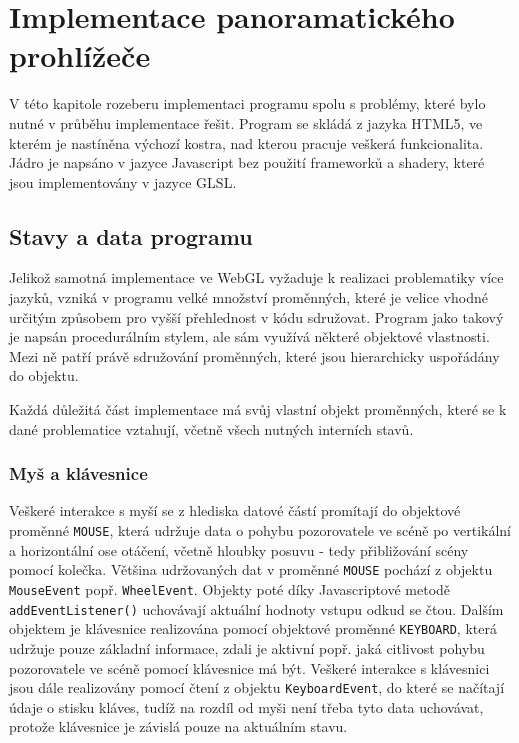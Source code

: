 \chapter{Implementace panoramatického prohlížeče}
\label{chapter:4}
V této kapitole rozeberu implementaci programu  spolu s  problémy, které bylo nutné v průběhu implementace řešit. Program se skládá z jazyka HTML5, ve kterém je nastíněna výchozí kostra, nad kterou pracuje veškerá funkcionalita. Jádro je napsáno v jazyce Javascript bez použití frameworků  a  shadery, které jsou implementovány v jazyce GLSL. 


\section{Stavy a data programu}
Jelikož samotná implementace ve WebGL vyžaduje k realizaci problematiky více jazyků, vzniká v programu velké množství proměnných, které je velice vhodné určitým způsobem pro vyšší přehlednost v kódu sdružovat. Program jako takový je napsán procedurálním stylem, ale sám využívá některé objektové vlastnosti. Mezi ně patří právě sdružování proměnných, které jsou hierarchicky uspořádány do objektu.

Každá důležitá část implementace má svůj vlastní objekt proměnných, které se k dané problematice vztahují, včetně všech nutných interních stavů.

\subsection{Myš a klávesnice}
Veškeré interakce s myší se z hlediska datové částí promítají do objektové proměnné \texttt{MOUSE}, která udržuje data o pohybu pozorovatele ve scéně po vertikální a horizontální ose otáčení, včetně hloubky posuvu - tedy přibližování scény pomocí kolečka. Většina udržovaných dat v proměnné \texttt{MOUSE} pochází z objektu \texttt{MouseEvent} popř. \texttt{WheelEvent}. Objekty poté díky Javascriptové metodě \texttt{addEventListener()} uchovávají aktuální hodnoty vstupu odkud se čtou.
Dalším objektem je klávesnice realizována pomocí objektové proměnné \texttt{KEYBOARD}, která udržuje pouze základní informace, zdali je aktivní popř. jaká citlivost pohybu pozorovatele ve scéně pomocí klávesnice má být. Veškeré interakce s klávesnici jsou dále realizovány pomocí čtení z objektu \texttt{KeyboardEvent}, do které se načítají údaje o stisku kláves, tudíž na rozdíl od myši není třeba tyto data uchovávat, protože klávesnice je závislá pouze na aktuálním stavu. 

